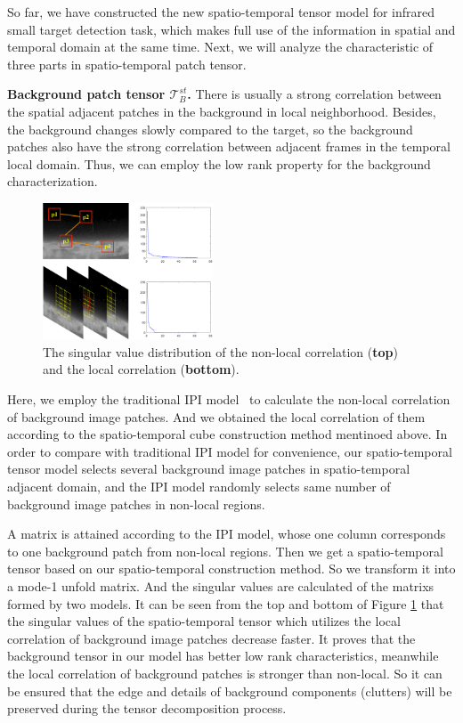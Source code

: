 \documentclass[journal]{IEEEtran}
\begin{document}
So far, we have constructed the new spatio-temporal tensor model for infrared small target detection task, which makes full use of the information in spatial and temporal domain at the same time. Next, we will analyze the characteristic of three parts in spatio-temporal patch tensor.


\textbf{Background patch tensor $\mathbf{\mathcal T}_B^{st}$.}\quad
There is usually a strong correlation between the spatial adjacent patches in the background in local neighborhood. Besides, the background changes slowly compared to the target, so the background patches also have the strong correlation between adjacent frames in the temporal local domain. Thus, we can employ the low rank property for the background characterization.

\begin{figure}[H]
  \centering
  \includegraphics[width=0.45\textwidth]{singular.eps}
  \caption{The singular value distribution of the non-local correlation (\textbf{top}) and the local correlation (\textbf{bottom}).}
  \label{singular}
\end{figure}

Here, we employ the traditional IPI model~\cite{gao2013infrared} to calculate the non-local correlation of background image patches. And we obtained the local correlation of them according to the spatio-temporal cube construction method mentinoed above. In order to compare with traditional IPI model for convenience, our spatio-temporal tensor model selects several background image patches in spatio-temporal adjacent domain, and the IPI model randomly selects same number of background image patches in non-local regions. 

A matrix is attained according to the IPI model, whose one column corresponds to one background patch from non-local regions. Then we get a spatio-temporal tensor based on our spatio-temporal construction method. So we transform it into a mode-1 unfold matrix. And the singular values are calculated of the matrixs formed by two models. It can be seen from the top and bottom of Figure \ref{singular} that the singular values of the spatio-temporal tensor which utilizes the local correlation of background image patches decrease faster. It proves that the background tensor in our model has better low rank characteristics, meanwhile the local correlation of background patches is stronger than non-local. So it can be ensured that the edge and details of background components (clutters) will be preserved during the tensor decomposition process.
\end{document}
